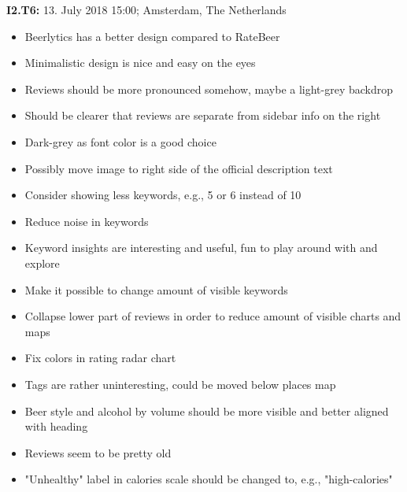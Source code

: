 \begin{flushleft}
    \textbf{I2.T6:} 13. July 2018 15:00; Amsterdam, The Netherlands
    \begin{itemize}
        \item Beerlytics has a better design compared to RateBeer
        \item Minimalistic design is nice and easy on the eyes
        \item Reviews should be more pronounced somehow, maybe a light-grey backdrop
        \item Should be clearer that reviews are separate from sidebar info on the right
        \item Dark-grey as font color is a good choice
        \item Possibly move image to right side of the official description text
        \item Consider showing less keywords, e.g., 5 or 6 instead of 10
        \item Reduce noise in keywords
        \item Keyword insights are interesting and useful, fun to play around with and explore
        \item Make it possible to change amount of visible keywords
        \item Collapse lower part of reviews in order to reduce amount of visible charts and maps
        \item Fix colors in rating radar chart
        \item Tags are rather uninteresting, could be moved below places map
        \item Beer style and alcohol by volume should be more visible and better aligned with heading
        \item Reviews seem to be pretty old
        \item "Unhealthy" label in calories scale should be changed to, e.g., "high-calories"
    \end{itemize}
\end{flushleft}